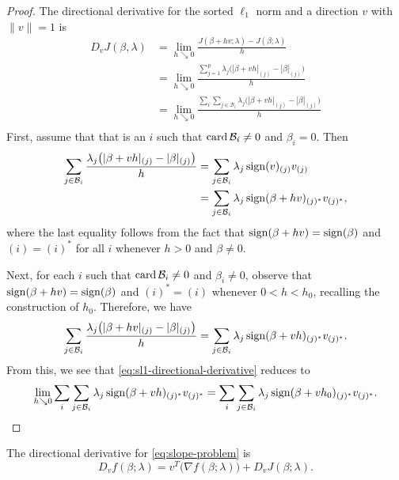 \begin{proof}
  The directional derivative for the sorted \(\ell_1\) norm and a direction
  \(v\) with \(\lVert v \rVert = 1\) is
  \begin{equation}
    \label{eq:sl1-directional-derivative}
    \begin{aligned}
      D_v J(\beta, \lambda) & = \lim_{h \searrow 0} \frac{J(\beta + h v; \lambda) - J(\beta; \lambda)}{h}                                            \\
                            & = \lim_{h \searrow 0} \frac{\sum_{j=1}^p\lambda_j\big(|\beta + vh|_{(j)} - |\beta|_{(j)}\big)}{h}                      \\
                            & = \lim_{h \searrow 0}\frac{\sum_i \sum_{j \in \mathcal{B}_i} \lambda_j\big(|\beta + vh|_{(j)} - |\beta|_{(j)}\big)}{h} \\
    \end{aligned}
  \end{equation}
  First, assume that that is an \(i\) such that \(\operatorname{card} \mathcal{B}_i \neq 0\)
  and \(\beta_i = 0\).
  Then
  \[
    \begin{aligned}
      \sum_{j \in \mathcal{B}_i}\frac{\lambda_j \big( |\beta + vh|_{(j)} - |\beta|_{(j)}\big)}{h}
       & = \sum_{j \in \mathcal{B}_i} \lambda_j \operatorname{sign}(v)_{(j)}v_{(j)}               \\
       & = \sum_{j \in \mathcal{B}_i} \lambda_j \operatorname{sign}(\beta + hv)_{(j)^*}v_{(j)^*},
    \end{aligned}
  \]
  where the last equality follows from the fact that \(\operatorname{sign}(\beta + hv) =
  \operatorname{sign}(\beta)\) and \((i) = (i)^*\) for all \(i\) whenever \(h > 0\) and
  \(\beta \neq 0\).

  Next, for each \(i\) such that \(\operatorname{card} \mathcal{B}_i \neq 0\) and
  \(\beta_i \neq 0\), observe that \(\operatorname{sign}(\beta + hv) = \operatorname{sign}(\beta)\) and
  \((i)^* = (i)\) whenever \(0 < h < h_0\), recalling the construction
  of \(h_0\).
  Therefore, we have
  \[
    \sum_{j \in \mathcal{B}_i} \frac{\lambda_j\big(|\beta + hv|_{(j)} - |\beta|_{(j)}\big)}{h}
    = \sum_{j \in \mathcal{B}_i} \lambda_j\operatorname{sign}(\beta + vh)_{(j)^*}v_{(j)^*}.
  \]
  From this, we see that \eqref{eq:sl1-directional-derivative} reduces to
  \[
    \lim_{h \searrow 0} \sum_i \sum_{j \in \mathcal{B}_i} \lambda_j\operatorname{sign}(\beta + vh)_{(j)^*}v_{(j)^*}
    = \sum_i \sum_{j \in \mathcal{B}_i} \lambda_j\operatorname{sign}(\beta + vh_0)_{(j)^*}v_{(j)^*}.
  \]
\end{proof}

\begin{remark}
  The directional derivative for \eqref{eq:slope-problem} is
  \[
    D_v f(\beta; \lambda) = v^T \big(\nabla f(\beta; \lambda)\big) + D_v J(\beta; \lambda).
  \]
\end{remark}
